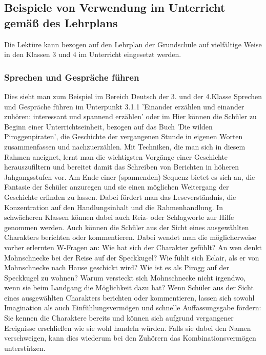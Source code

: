 {\subsection{Beispiele von Verwendung im Unterricht gemäß des Lehrplans}

Die Lektüre kann bezogen auf den Lehrplan der Grundschule \cite{Lehrplan der Grundschule, Bayern 2000} auf vielfältige Weise in den Klassen 3 und 4 im Unterricht eingesetzt werden. 

\subsubsection{Sprechen und Gespräche führen}

Dies sieht man zum Beispiel im Bereich Deutsch der 3. und der 4.Klasse Sprechen und Gespräche führen im Unterpunkt 3.1.1 'Einander erzählen und einander zuhören: interessant und spannend erzählen' oder im\cite{Lehrplan der Grundschule, Bayern 2000} 
Hier können die Schüler zu Beginn einer Unterrichtseinheit, bezogen auf das Buch 'Die wilden Piroggenpiraten',\cite{pir} die Geschichte der vergangenen Stunde in eigenen Worten zusammenfassen und nachzuerzählen. Mit Techniken, die man sich in diesem Rahmen aneignet, lernt man die wichtigsten Vorgänge einer Geschichte herauszufiltern und  bereitet damit das Schreiben von Berichten in höheren Jahgangsstufen vor. 
Am Ende einer (spannenden) Sequenz bietet es sich an, die Fantasie der Schüler anzuregen und sie einen möglichen Weitergang der Geschichte erfinden zu lassen. Dabei fördert man das Leseverständnis, die Konzentration auf den Handlungsinhalt und die Rahmenhandlung. In schwächeren Klassen können dabei auch Reiz- oder Schlagworte zur Hilfe genommen werden. 
Auch können die Schüler aus der Sicht eines ausgewählten Charakters berichten oder kommentieren. Dabei wendet man die möglicherweise vorher erlernten W-Fragen an: Wie hat sich der Charakter gefühlt? An wen denkt Mohnschnecke bei der Reise auf der Speckkugel? Wie fühlt sich Eclair, als er von Mohnschnecke nach Hause geschickt wird? Wie ist es als Pirogg auf der Speckkugel zu wohnen? Warum versteckt sich Mohnschnecke nicht irgendwo, wenn sie beim Landgang die Möglichkeit dazu hat?
Wenn Schüler aus der Sicht eines ausgewählten Charakters berichten oder kommentieren, lassen sich sowohl Imagination als auch Einfühlungsvermögen und schnelle Auffassungsgabe fördern: Sie kennen die Charaktere bereits und können sich aufgrund vergangener Ereignisse erschließen wie sie wohl handeln würden. Falls sie dabei den Namen verschweigen, kann dies wiederum bei den Zuhörern das Kombinationsvermögen unterstützen.

}

